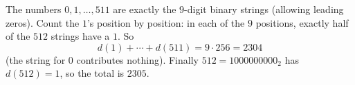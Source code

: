 The numbers $0,1,\ldots,511$ are exactly the $9$-digit binary strings (allowing leading zeros). Count the $1$'s position by position: in each of the $9$ positions, exactly half of the $512$ strings have a $1$. So
\[d(1)+\cdots+d(511)=9\cdot256=2304\]
(the string for $0$ contributes nothing). Finally $512=1000000000_2$ has $d(512)=1$, so the total is $\boxed{2305}$.
